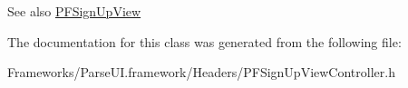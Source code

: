\begin{DoxySeeAlso}{See also}
\hyperlink{interface_p_f_sign_up_view}{P\+F\+Sign\+Up\+View} 
\end{DoxySeeAlso}


The documentation for this class was generated from the following file\+:\begin{DoxyCompactItemize}
\item 
Frameworks/\+Parse\+U\+I.\+framework/\+Headers/P\+F\+Sign\+Up\+View\+Controller.\+h\end{DoxyCompactItemize}
